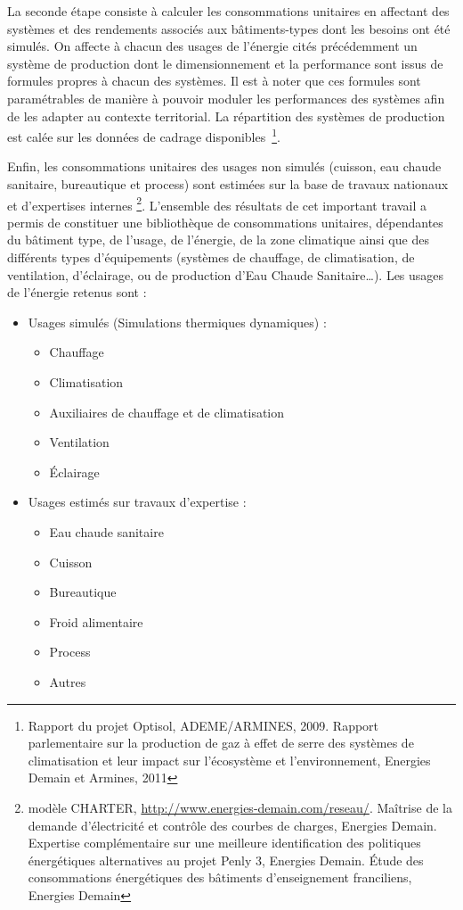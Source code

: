 \documentclass[10.5pt,a4paper]{article}
\begin{document}
{La seconde étape consiste à calculer les consommations unitaires en affectant des systèmes et des rendements associés aux bâtiments-types dont les besoins ont été simulés. 
On affecte à chacun des usages de l’énergie cités précédemment un système de production dont le dimensionnement et la performance sont issus de formules propres à chacun des systèmes. Il est à noter que ces formules sont paramétrables de manière à pouvoir moduler les performances des systèmes afin de les adapter au contexte territorial.
La répartition des systèmes de production est calée sur les données de cadrage disponibles~\footnote{Rapport du projet Optisol, ADEME/ARMINES, 2009. Rapport parlementaire sur la production de gaz à effet de serre des systèmes de climatisation et leur impact sur l’écosystème et l’environnement, Energies Demain et Armines, 2011}.

Enfin, les consommations unitaires des usages non simulés (cuisson, eau chaude sanitaire, bureautique et process) sont estimées sur la base de travaux nationaux et d’expertises internes \footnote{modèle CHARTER, \url{http://www.energies-demain.com/reseau/}. Maîtrise de la demande d’électricité et contrôle des courbes de charges, Energies Demain. Expertise complémentaire sur une meilleure identification des politiques énergétiques alternatives au projet Penly 3, Energies Demain. Étude des consommations énergétiques des bâtiments d’enseignement franciliens, Energies Demain}. L’ensemble des résultats de cet important travail a permis de constituer une bibliothèque de consommations unitaires, dépendantes du bâtiment type, de l’usage, de l’énergie, de la zone climatique ainsi que des différents types d’équipements (systèmes de chauffage, de climatisation, de ventilation, d’éclairage, ou de production d’Eau Chaude Sanitaire…). Les usages de l’énergie retenus sont :

\begin{itemize}
	
	\item Usages simulés (Simulations thermiques dynamiques) : 
	\begin{itemize}
		\item Chauffage
		\item Climatisation
		\item Auxiliaires de chauffage et de climatisation
		\item Ventilation
		\item Éclairage
  \end{itemize}
	\item Usages estimés sur travaux d'expertise : 
		\begin{itemize}
		\item Eau chaude sanitaire
		\item Cuisson
		\item Bureautique
		\item Froid alimentaire
		\item Process
		\item Autres
	\end{itemize}
\end{itemize}


}
\end{document}
